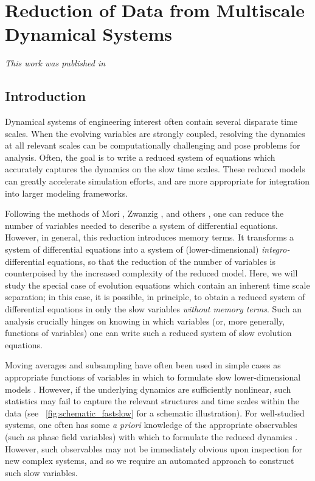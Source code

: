 
\chapter{Reduction of Data from Multiscale Dynamical Systems \label{ch:multiscale}}

\graphicspath{{ch-multiscale/figures/}}

{\em This work was published in \citep{dsilva2015data}}

\section{Introduction}

Dynamical systems of engineering interest often contain several disparate time scales.
%
When the evolving variables are strongly coupled, resolving the
dynamics at all relevant scales can be computationally challenging and pose problems for analysis.
%
Often, the goal is to write a reduced system of equations which accurately captures the dynamics on the slow time scales.
%
These reduced models can greatly accelerate simulation efforts, and are more appropriate for integration into larger modeling frameworks.

Following the methods of Mori \cite{mori1965transport}, Zwanzig \cite{zwanzig1961memory}, and others \cite{brey1981nonlinear, chorin2000optimal, hijon2010mori}, one can reduce the number of variables needed to describe a system of differential equations.
%
However, in general, this reduction introduces memory terms.
%
It transforms a system of differential equations into a system of (lower-dimensional) {\em integro-}differential equations,
so that the reduction of the number of variables is counterpoised by the increased complexity of the  reduced model.
%
Here, we will study the special case of evolution equations which contain an inherent time scale separation;
in this case, it is possible, in principle, to obtain a reduced system of differential equations in only the slow variables {\em without memory terms}.
%
Such an analysis crucially hinges on knowing in which variables (or, more generally, functions of variables) one can write such a reduced system of slow evolution equations.

Moving averages and subsampling have often been used in simple cases as appropriate functions of variables in which to formulate slow lower-dimensional models \cite{pavliotis2007parameter}.
%
However, if the underlying dynamics are sufficiently nonlinear, such statistics may
fail to capture the relevant structures and time scales within the data (see \fig~\ref{fig:schematic_fastslow} for a schematic illustration).
%
For well-studied systems, one often has some {\em a priori} knowledge of the appropriate observables (such as phase field variables) with which to formulate the reduced dynamics \cite{chen2002phase, wheeler1992phase}.
%
However, such observables may not be immediately obvious upon inspection for new complex systems, and so we require an automated approach to construct such slow variables.


